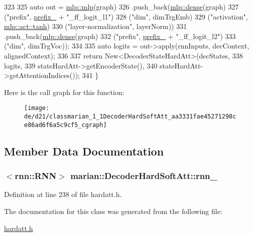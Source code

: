 \begin{DoxyCode}
323 
325     \textcolor{keyword}{auto} out = \hyperlink{namespacemarian_1_1mlp_a4d0fe240d31bdc33bcbdb5401de49e27}{mlp::mlp}(graph)
326                .push\_back(\hyperlink{namespacemarian_1_1mlp_a8c25b1e343bf78e66cd9e33e607efeb5}{mlp::dense}(graph)
327                           (\textcolor{stringliteral}{"prefix"}, \hyperlink{classmarian_1_1DecoderBase_a043a90801b6bda9a45e309607136e947}{prefix\_} + \textcolor{stringliteral}{"\_ff\_logit\_l1"})
328                           (\textcolor{stringliteral}{"dim"}, dimTrgEmb)
329                           (\textcolor{stringliteral}{"activation"}, \hyperlink{namespacemarian_1_1mlp_ac16d27a877d16d7394f2057aee439d72a5c0dbba3a6ee4ac0eb26cfee75ccb8b4}{mlp::act::tanh})
330                           (\textcolor{stringliteral}{"layer-normalization"}, layerNorm))
331                .push\_back(\hyperlink{namespacemarian_1_1mlp_a8c25b1e343bf78e66cd9e33e607efeb5}{mlp::dense}(graph)
332                           (\textcolor{stringliteral}{"prefix"}, \hyperlink{classmarian_1_1DecoderBase_a043a90801b6bda9a45e309607136e947}{prefix\_} + \textcolor{stringliteral}{"\_ff\_logit\_l2"})
333                           (\textcolor{stringliteral}{"dim"}, dimTrgVoc));
334 
335     \textcolor{keyword}{auto} logits = out->apply(rnnInputs, decContext, alignedContext);
336 
337     \textcolor{keywordflow}{return} New<DecoderStateHardAtt>(decStates,
338                                     logits,
339                                     stateHardAtt->getEncoderState(),
340                                     stateHardAtt->getAttentionIndices());
341   \}
\end{DoxyCode}


Here is the call graph for this function\+:
\nopagebreak
\begin{figure}[H]
\begin{center}
\leavevmode
\texttt{[image: de/d21/classmarian\_1\_1DecoderHardSoftAtt\_aa3331fae45271298ce86ad6f6a5c9cf5\_cgraph]}
\end{center}
\end{figure}




\subsection{Member Data Documentation}
\subsubsection[{\texorpdfstring{rnn\+\_\+}{rnn_}}]{$<$rnn\+::\+R\+NN$>$ marian\+::\+Decoder\+Hard\+Soft\+Att\+::rnn\+\_\+\hspace{0.3cm}{\ttfamily [protected]}}\hypertarget{classmarian_1_1DecoderHardSoftAtt_ae077a0f8f32a457c0c2c972ca4251ede}{}\label{classmarian_1_1DecoderHardSoftAtt_ae077a0f8f32a457c0c2c972ca4251ede}


Definition at line 238 of file hardatt.\+h.



The documentation for this class was generated from the following file\+:\begin{DoxyCompactItemize}
\item 
\hyperlink{hardatt_8h}{hardatt.\+h}\end{DoxyCompactItemize}
